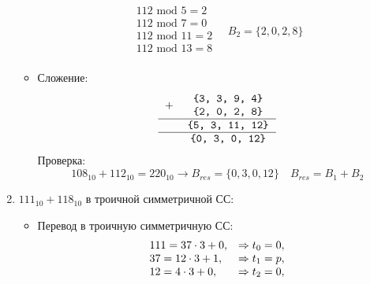 \documentclass[oneside,a4paper,14pt]{extarticle} %
\begin{document}
\begin{enumerate}
\begin{itemize}
                    $$
                        \begin{array}{lr}
                            112 \textrm{ mod } 5 = 2 \\
                            112 \textrm{ mod } 7 = 0 \\
                            112 \textrm{ mod } 11 = 2 \\
                            112 \textrm{ mod } 13 = 8 \\
                        \end{array}
                        \quad B_{2} = \{2, 0, 2, 8\}
                    $$
                \item Сложение:
                    $$
                        \begin{tabular}{{c}{c}}
                        \texttt{$+$ }&
                        \begin{tabular}{c}
                        \texttt{\{3, 3, 9, 4\}}\\
                        \texttt{\{2, 0, 2, 8\}}\\
                        \end{tabular} \\ 
                        \hline
                        & \texttt{\{5, 3, 11, 12\}}\\
                        \hline
                        & \texttt{\{0, 3, 0, 12\}} \\
                        \end{tabular}
                    $$
                Проверка: 
                    $$
                        108_{10} + 112_{10} = 220_{10} \to B_{res} = \{0, 3, 0, 12\}
                        \quad B_{res} = B_{1} + B_{2}
                    $$
            \end{itemize}
            \pagebreak
            \item $111_{10}+118_{10}$ в троичной симметричной СС:
                \begin{itemize}
                    \item Перевод в троичную симметричную СС:
                        $$
                            \begin{array}[c]{ll}
                                111 = 37\cdot 3 + 0, &\Rightarrow t_{0}=0, \\
                                37 = 12 \cdot 3 + 1,  &\Rightarrow t_{1}=p, \\
                                12=4\cdot 3 + 0,   &\Rightarrow t_{2}=0, \\

\end{array}$$
\end{itemize}
\end{enumerate}
\end{document}
